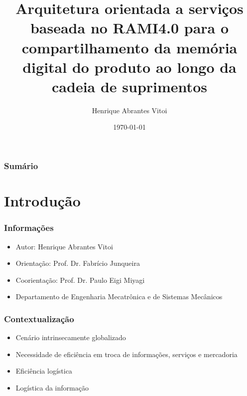 \documentclass[10pt]{beamer}
\title{Arquitetura orientada a servi\c{c}os baseada no RAMI4.0 para o compartilhamento da mem\'{o}ria digital do produto ao longo da cadeia de suprimentos} %
\author{Henrique Abrantes Vitoi} %
\institute[Poli-USP] %
{
Escola Politécnica da Universidade de São Paulo \\
Engenharia de Controle e Automação Mecânica

}
\date{\today} %
\begin{document}
	

\begin{frame}
	\titlepage %
\end{frame}

\begin{frame}
	\frametitle{Sumário} %
	\tableofcontents %
\end{frame}

\section{Introdução}

\begin{frame}
	
	\frametitle{Informações}
	
	\begin{itemize}
		\item Autor: Henrique Abrantes Vitoi
		\item Orientação: Prof. Dr. Fabrício Junqueira
		\item Coorientação: Prof. Dr. Paulo Eigi Miyagi
		\item Departamento de Engenharia Mecatrônica e de Sistemas Mecânicos
		
	\end{itemize}

\end{frame}

\begin{frame}
	
	\frametitle{Contextualização}
		
	\begin{itemize}
		\item Cenário intrinsecamente globalizado
		\item Necessidade de eficiência em troca de informações, serviços e mercadoria
		\item Eficiência logística
		\item Logística da informação
	\end{itemize}

\end{frame}
\end{document}
